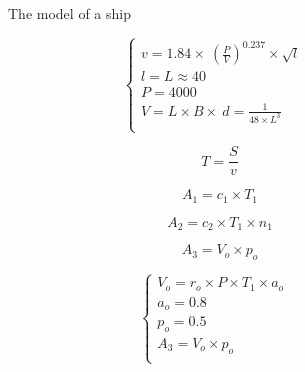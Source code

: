 \documentclass{mcmthesis}
\begin{document}
\begin{figure}[tbp]
  \caption{The model of a ship}\label{figure1}
\end{figure}

\begin{equation}
\left\{
\begin{array}{lr}
v=1.84\times \ (\frac{P}{V}) ^{0.237} \times \sqrt{l} &\\
l=L\approx 40 &\\
P=4000&\\
V=L\times B\times\ d =\frac{1}{48\times L^3}\\
\end{array}
\right.
\end{equation}

\begin{equation}\label{5}
T=\frac{S}{v}
\end{equation}


\begin{equation}\label{5}
A_1=c_1 \times T_1
\end{equation}

\begin{equation}\label{6}
A_2=c_2  \times T_1 \times n_1
\end{equation}

\begin{equation}\label{7}
A_3=V_o  \times p_o
\end{equation}

\begin{equation}
\left\{
\begin{array}{lr}
V_o=r_o \times P \times T_1 \times a_o &\\
a_o=0.8&\\
p_o=0.5&\\
A_3=V_o  \times p_o\\
\end{array}
\right.
\end{equation}
\end{document}
